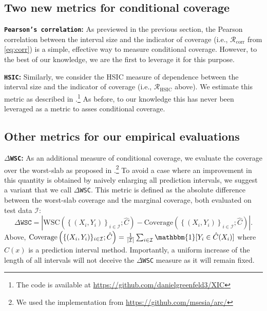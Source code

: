 \documentclass{article}
\begin{document}
\subsection{Two new metrics for conditional coverage}
\textbf{\texttt{Pearson's correlation}:} 
As previewed in the previous section, the Pearson correlation between the interval size and the indicator of coverage (i.e., $\mathcal{R}_{\textrm{corr}}$ from \eqref{eq:corr}) is a simple, effective way to measure conditional coverage. However, to the best of our knowledge, we are the first to leverage it for this purpose.

\textbf{\texttt{HSIC}:} Similarly, we consider the HSIC measure of dependence between the interval size and the indicator of coverage (i.e., $\mathcal{R}_{\textrm{HSIC}}$ above). We estimate this metric as described in \cite{hsic_implementation}.\footnote{The code is available at \url{https://github.com/danielgreenfeld3/XIC}} As before, to our knowledge this has never been leveraged as a metric to asses conditional coverage.

\subsection{Other metrics for our empirical evaluations}
\textbf{$\Delta$\texttt{WSC}:} As an additional measure of conditional coverage, we  evaluate the coverage over the worst-slab as proposed in \cite{wsc}.\footnote{We used the implementation from  \url{https://github.com/msesia/arc/}} To avoid a case where an improvement in this quantity is obtained by naively enlarging all prediction intervals, we suggest a variant that we call $\Delta$\texttt{WSC}. This metric is defined as the absolute difference between the worst-slab coverage and the marginal coverage, both evaluated on test data $\mathcal{I}$:
\begin{equation*}
\Delta \texttt{WSC}= \left| \textrm{WSC}\left(\left\{\left(X_i, Y_i\right)\right\}_{i \in \mathcal{I}}; \hat{C}\right) - \textrm{Coverage}\left(\left\{(X_i,Y_i)\right\}_{i \in \mathcal{I}}; \hat{C}\right) \right|.
\end{equation*}
Above, $\textrm{Coverage}\left(\{(X_i,Y_i)\}_{i \in \mathcal{I}}; \hat{C}\right) = \frac{1}{|\mathcal{I}|}\sum_{i \in \mathcal{I}}{\mathbbm{1}[Y_i \in  \hat{C}(X_i)]}$ where $\hat{C}(x)$ is a prediction interval method. Importantly, a uniform increase of the length of all intervals will not deceive the $\Delta$\texttt{WSC} measure as it will remain fixed.
\end{document}
